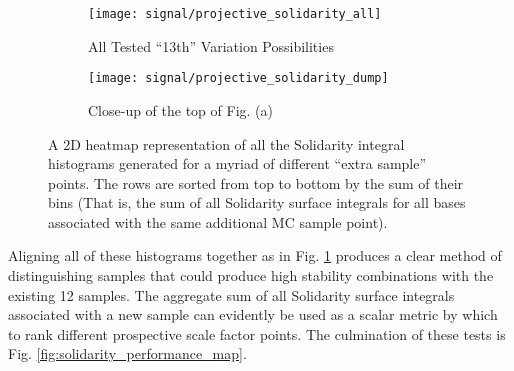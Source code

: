    \begin{figure}[tbh]
        \begin{subfigure}{0.5\textwidth}
            \texttt{[image: signal/projective\_solidarity\_all]}
            \captionsetup{justification=centering} \caption{All Tested ``13th'' Variation Possibilities}
        \end{subfigure}
        \begin{subfigure}{0.5\textwidth}
            \texttt{[image: signal/projective\_solidarity\_dump]}
            \captionsetup{justification=centering} \caption{Close-up of the top of Fig. (a)}
        \end{subfigure}
        \caption{
            A 2D heatmap representation of all the Solidarity integral histograms generated for a myriad of different ``extra sample'' points.
            The rows are sorted from top to bottom by the sum of their bins
                (That is, the sum of all Solidarity surface integrals for all bases associated with the same additional MC sample point).
        }
        \label{fig:solidarity_dump}
    \end{figure}

    Aligning all of these histograms together as in Fig. \ref{fig:solidarity_dump}
        produces a clear method of distinguishing samples that 
        could produce high stability combinations with the existing 12 samples.
    The aggregate sum of all Solidarity surface integrals associated with a new sample
        can evidently be used as a scalar metric by which to rank different prospective scale factor points.
    The culmination of these tests is Fig. \ref{fig:solidarity_performance_map}.


